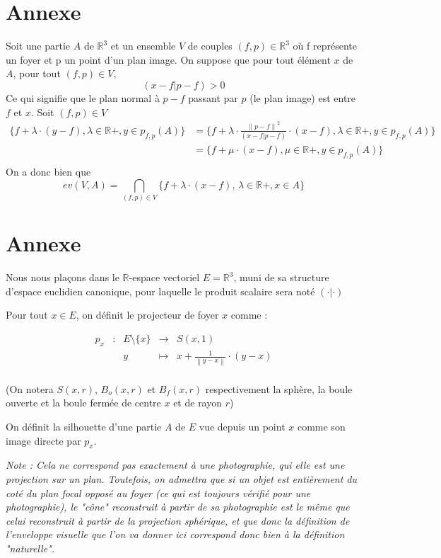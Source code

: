 \documentclass[a4paper]{article}
\newcommand{\norm}[1]{\left\lVert#1\right\rVert}
\begin{document}
  \appendix
  \section{Annexe}\label{AnnexeA}
    Soit une partie $A$ de $\mathbb{R}^3$ et un ensemble $V$ de couples $(f, p) \in \mathbb{R}^3$ où f représente un foyer et p un point d'un plan image. On suppose que pour tout élément $x$ de $A$, pour tout $(f, p) \in V$,  
    \[(x - f | p - f) > 0\]
    Ce qui signifie que le plan normal à $p - f$ passant par $p$ (le plan image) est entre $f$ et $x$.
    Soit $(f, p) \in V$
    \begin{align*}
      \{f + \lambda \cdot (y - f), \lambda \in \mathbb{R}+, y \in p_{f, p}(A)\}
      &= \{f + \lambda \cdot \frac{\norm{p - f}^2}{(x - f | p - f)} \cdot (x - f), \lambda \in \mathbb{R}+, y \in p_{f, p}(A)\}\\
      &= \{f + \mu \cdot (x - f), \mu \in \mathbb{R}+, y \in p_{f, p}(A)\}\\
    \end{align*}
    On a donc bien que
    \[
      ev(V, A) = \bigcap_{(f, p) \in V} \{f + \lambda \cdot (x - f), \, \lambda \in \mathbb{R}+, x \in A\}
    \]
  \section{Annexe}\label{AnnexeB}
    Nous nous plaçons dans le $\mathbb{R}$-espace vectoriel $E = \mathbb{R}^{3}$, muni de sa structure d'espace euclidien canonique, pour laquelle le produit scalaire sera noté $(\cdot|\cdot)$


    Pour tout $x\in E$, on définit le projecteur de foyer $x$ comme :

    \[\begin{array}{ccccl}
    p_{x} & : & E\setminus\{x\} & \to & S(x, 1) \\
     & & y & \mapsto & x  + \frac{1}{\norm{y - x}} \cdot (y - x) \\
    \end{array}\]

    (On notera $S(x, r)$, $B_{o}(x, r)$ et $B_{f}(x, r)$ respectivement la sphère, la boule ouverte et la boule fermée de centre $x$ et de rayon $r$)


    On définit la silhouette d'une  partie $A$ de $E$ vue depuis un point $x$ comme son image directe par $p_{x}$.

    \textit{Note : Cela ne correspond pas exactement à une photographie, qui elle est une projection sur un plan. Toutefois, on admettra que si un objet est entièrement du coté du plan focal opposé au foyer (ce qui est toujours vérifié pour une photographie), le "cône" reconstruit à partir de sa photographie est le même que celui reconstruit à partir de la projection sphérique, et que donc la définition de l'enveloppe visuelle que l'on va donner ici correspond donc bien à la définition "naturelle".}
\end{document}
